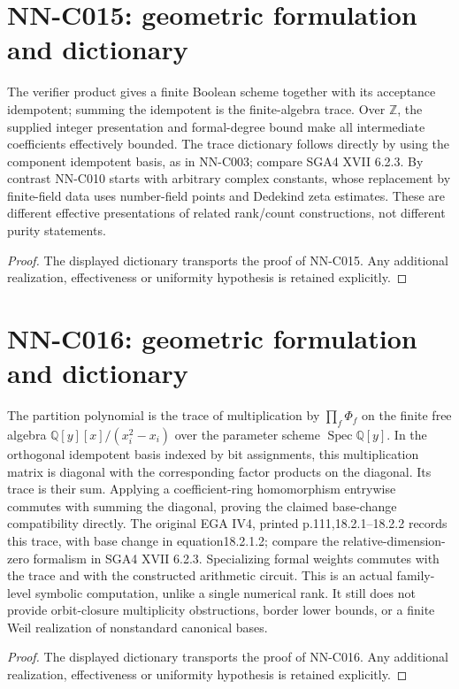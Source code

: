 \section{NN-C015: geometric formulation and dictionary}
\begin{geometricstatement}[NN-C015]
The verifier product gives a finite Boolean scheme together with its acceptance idempotent; summing the idempotent is the finite-algebra trace. Over $\mathbb Z$, the supplied integer presentation and formal-degree bound make all intermediate coefficients effectively bounded. The trace dictionary follows directly by using the component idempotent basis, as in NN-C003; compare SGA4 XVII 6.2.3. By contrast NN-C010 starts with arbitrary complex constants, whose replacement by finite-field data uses number-field points and Dedekind zeta estimates. These are different effective presentations of related rank/count constructions, not different purity statements.
\end{geometricstatement}
\begin{proof} The displayed dictionary transports the proof of NN-C015. Any additional realization, effectiveness or uniformity hypothesis is retained explicitly.\end{proof}


\section{NN-C016: geometric formulation and dictionary}
\begin{geometricstatement}[NN-C016]
The partition polynomial is the trace of multiplication by $\prod_f\Phi_f$ on the finite free algebra $\mathbb Q[y][x]/(x_i^2-x_i)$ over the parameter scheme $\operatorname{Spec}\mathbb Q[y]$. In the orthogonal idempotent basis indexed by bit assignments, this multiplication matrix is diagonal with the corresponding factor products on the diagonal. Its trace is their sum. Applying a coefficient-ring homomorphism entrywise commutes with summing the diagonal, proving the claimed base-change compatibility directly. The original EGA IV4, printed p.111,18.2.1--18.2.2 records this trace, with base change in equation18.2.1.2; compare the relative-dimension-zero formalism in SGA4 XVII 6.2.3. Specializing formal weights commutes with the trace and with the constructed arithmetic circuit. This is an actual family-level symbolic computation, unlike a single numerical rank. It still does not provide orbit-closure multiplicity obstructions, border lower bounds, or a finite Weil realization of nonstandard canonical bases.
\end{geometricstatement}
\begin{proof} The displayed dictionary transports the proof of NN-C016. Any additional realization, effectiveness or uniformity hypothesis is retained explicitly.\end{proof}


